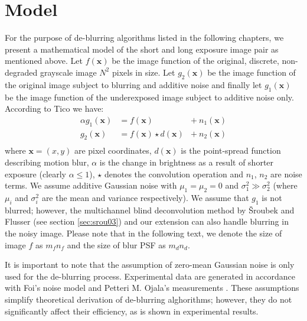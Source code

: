 \documentclass[12pt,notitlepage]{report}
\begin{document}
\clearpage

\section{Model}
\label{sec:model}

For the purpose of de-blurring algorithms listed in the following chapters, we present a mathematical model of the short and long exposure image pair as mentioned above. Let $f(\mathbf{x})$ be the image function of the original, discrete, non-degraded grayscale image $N^2$ pixels in size. Let $g_2(\mathbf{x})$ be the image function of the original image subject to blurring and additive noise  and finally let $g_1(\mathbf{x})$ be the image function of the underexposed image subject to additive noise only. According to Tico \cite{tico06} we have:
\begin{equation}
	\label{eq:general_model}
	\begin{aligned}
		\alpha g_1(\mathbf{x}) &= f(\mathbf{x}) &+ \ n_1(\mathbf{x}) \\
		g_2(\mathbf{x}) &= f(\mathbf{x}) \star d(\mathbf{x}) &+ \ n_2(\mathbf{x}) \\
	\end{aligned}
\end{equation}
where $\mathbf{x}=(x,y)$ are pixel coordinates, $d(\mathbf{x})$ is the point-spread function describing motion blur, $\alpha$ is the change in brightness as a result of shorter exposure (clearly $\alpha \leq 1$), $\star$ denotes the convolution operation and $n_1$, $n_2$ are noise terms. We assume additive Gaussian noise with $\mu_1 = \mu_2 = 0$ and $\sigma_1^2 \gg \sigma_2^2$ (where $\mu_i$ and $\sigma_i^2$ are the mean and variance respectively). We assume that $g_1$ is not blurred; however, the multichannel blind deconvolution method by Šroubek and Flusser (see section \ref{sec:srou03}) and our extension can also handle blurring in the noisy image. Please note that in the following text, we denote the size of image $f$ as $m_f n_f$ and the size of blur PSF as $m_d n_d$.

It is important to note that the assumption of zero-mean Gaussian noise is only used for the de-blurring process. Experimental data are generated in accordance with Foi's \cite{foi07} noise model and Petteri M. Ojala's measurements \cite{ojal08}. These assumptions simplify theoretical derivation of de-blurring alghorithms; however, they do not significantly affect their efficiency, as is shown in experimental results.     
\end{document}
